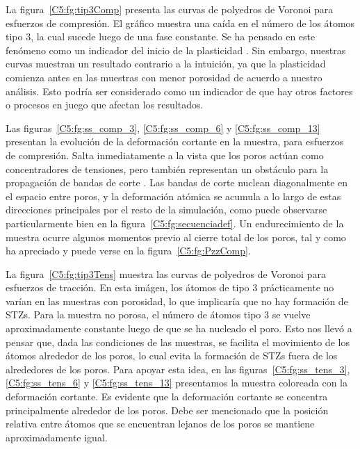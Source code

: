 La figura~\ref{C5:fg:tip3Comp} presenta las curvas de polyedros de Voronoi para esfuerzos de compresión. El gráfico muestra una caída en el número
de los átomos tipo 3, la cual sucede luego de una fase constante. Se ha pensado en este fenómeno como un indicador del inicio de la plasticidad
\citep{arman10}. Sin embargo, nuestras curvas muestran un resultado contrario a la intuición, ya que la plasticidad comienza antes en las muestras con menor
porosidad de acuerdo a nuestro análisis. Esto podría ser considerado como un indicador de que hay otros factores o procesos en juego que afectan
los resultados.

Las figuras~\ref{C5:fg:ss_comp_3}, \ref{C5:fg:ss_comp_6} y \ref{C5:fg:ss_comp_13} presentan la evolución de la deformación cortante en la muestra, para esfuerzos de compresión.
Salta inmediatamente a la vista que los poros actúan como concentradores de tensiones, pero también representan un obstáculo para la
propagación de bandas de corte \citep{wang10}. Las bandas de corte nuclean diagonalmente en el espacio entre poros, y la deformación atómica
se acumula a lo largo de estas direcciones principales por el resto de la simulación, como puede observarse particularmente bien en la figura~\ref{C5:fg:secuenciadef}. Un endurecimiento de la muestra ocurre algunos momentos previo al cierre total de los poros, tal y como ha apreciado \cite{yuan14} y puede verse en la figura~\ref{C5:fg:PzzComp}.

La figura~\ref{C5:fg:tip3Tens} muestra las curvas de polyedros de Voronoi para esfuerzos de tracción. En esta imágen, los átomos de tipo 3
prácticamente no varían en las muestras con porosidad, lo que implicaría que no hay formación de STZs.
Para la muestra no porosa, el número de átomos tipo 3 se vuelve aproximadamente constante luego de que se ha nucleado el poro. Esto
nos llevó a pensar que, dada las condiciones de las muestras, se facilita el movimiento de los átomos alrededor de los poros, lo cual evita
la formación de STZs fuera de los alrededores de los poros. Para apoyar esta idea, en las figuras~\ref{C5:fg:ss_tens_3}, \ref{C5:fg:ss_tens_6} y \ref{C5:fg:ss_tens_13} presentamos
la muestra coloreada con la deformación cortante. Es evidente que la deformación cortante se concentra principalmente alrededor
de los poros. Debe ser mencionado que la posición relativa entre átomos que se encuentran lejanos de los poros se mantiene aproximadamente igual.

